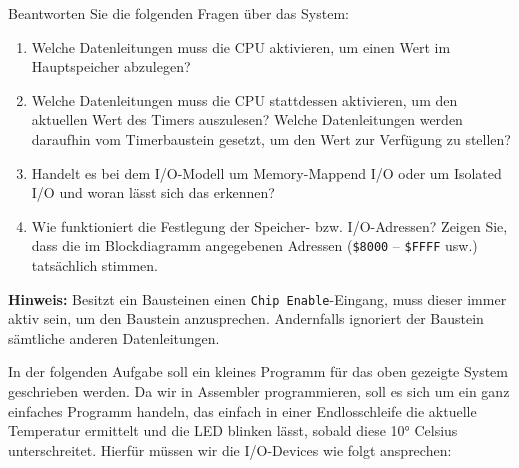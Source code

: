Beantworten Sie die folgenden Fragen über das System:

\begin{enumerate}
    \item Welche Datenleitungen muss die CPU aktivieren, um einen Wert im
    Hauptspeicher abzulegen?

    \item Welche Datenleitungen muss die CPU stattdessen aktivieren, um den
    aktuellen Wert des Timers auszulesen? Welche Datenleitungen werden daraufhin
    vom Timerbaustein gesetzt, um den Wert zur Verfügung zu stellen?

    \item Handelt es bei dem I/O-Modell um \glqq{}Memory-Mappend I/O\grqq{}
    oder um \glqq{}Isolated I/O\grqq{} und woran lässt sich das erkennen?

    \item Wie funktioniert die Festlegung der Speicher- bzw. I/O-Adressen?
    Zeigen Sie, dass die im Blockdiagramm angegebenen Adressen
    (\texttt{\$8000} -- \texttt{\$FFFF} usw.) tatsächlich stimmen.
\end{enumerate}

\textbf{Hinweis:} Besitzt ein Bausteinen einen \texttt{Chip Enable}-Eingang,
muss dieser immer aktiv sein, um den Baustein anzusprechen. Andernfalls ignoriert
der Baustein sämtliche anderen Datenleitungen.

\clearpage

In der folgenden Aufgabe soll ein kleines Programm für das oben gezeigte
System geschrieben werden. Da wir in Assembler programmieren, soll es sich
um ein ganz einfaches Programm handeln, das einfach in einer Endlosschleife
die aktuelle Temperatur ermittelt und die LED blinken lässt, sobald diese
10° Celsius unterschreitet. Hierfür müssen wir die I/O-Devices wie folgt
ansprechen:

